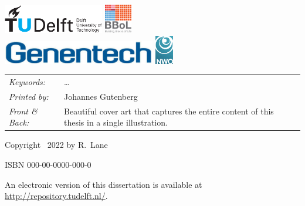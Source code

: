 \begin{titlepage}

\vfill
\begin{center}
    \includegraphics[height=0.5in]{title/logos/tudelft}
    \hspace{7em}
    \includegraphics[height=0.5in]{title/logos/BBol} \\
    \vspace{1em}
    \includegraphics[height=0.4in]{title/logos/genentech}
    \hspace{2em}
    \includegraphics[height=0.5in]{title/logos/nwo}
\end{center}
\vfill

\noindent
\begin{tabular}{@{}p{}@{}p{}}
    \textit{Keywords:} & \ldots \\[\medskipamount]
    \textit{Printed by:} & Johannes Gutenberg \\[\medskipamount]
    \textit{Front \& Back:} & Beautiful cover art that captures the entire content of this thesis in a single illustration.
\end{tabular}

\vspace{4\bigskipamount}

\noindent Copyright \textcopyright\ 2022 by R.~Lane


\medskip
\noindent ISBN 000-00-0000-000-0

\medskip
\noindent An electronic version of this dissertation is available at \\
\url{http://repository.tudelft.nl/}.

\end{titlepage}
